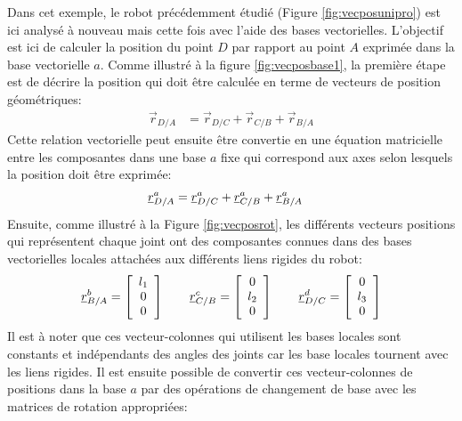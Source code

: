 \begin{example}
\label{sec:exer-cinematique-base}
%
Dans cet exemple, le robot précédemment étudié (Figure \ref{fig:vecposunipro}) est ici analysé à nouveau mais cette fois avec l'aide des bases vectorielles. L'objectif est ici de calculer la position du point $D$ par rapport au point $A$ exprimée dans la base vectorielle $a$. Comme illustré à la figure \ref{fig:vecposbase1}, la première étape est de décrire la position qui doit être calculée en terme de vecteurs de position géométriques:
\begin{align}
\vec{r}_{D/A} &= \vec{r}_{D/C} + \vec{r}_{C/B} + \vec{r}_{B/A}
\end{align} 
Cette relation vectorielle peut ensuite être convertie en une équation matricielle entre les composantes dans une base $a$ fixe qui correspond aux axes selon lesquels la position doit être exprimée:
\begin{align}
\underline{r}_{D/A}^a &= \underline{r}_{D/C}^a + \underline{r}_{C/B}^a + \underline{r}_{B/A}^a
\label{eq:exaddbase}
\end{align} 
Ensuite, comme illustré à la Figure \ref{fig:vecposrot}, les différents vecteurs positions qui représentent chaque joint ont des composantes connues dans des bases vectorielles locales attachées aux différents liens rigides du robot:
\begin{align}
\underline{r}_{B/A}^b = 
\left[ \begin{array}{c} 
l_1 \\ 0 \\ 0
\end{array} \right] 
\quad\quad
\underline{r}_{C/B}^c = 
\left[ \begin{array}{c} 
0 \\ l_2 \\ 0
\end{array} \right]
\quad\quad
\underline{r}_{D/C}^d = 
\left[ \begin{array}{c} 
0 \\ l_3 \\ 0
\end{array} \right] 
\end{align} 
Il est à noter que ces vecteur-colonnes qui utilisent les bases locales sont constants et indépendants des angles des joints car les base locales tournent avec les liens rigides. Il est ensuite possible de convertir ces vecteur-colonnes de positions dans la base $a$ par des opérations de changement de base avec les matrices de rotation appropriées:

\end{example}
